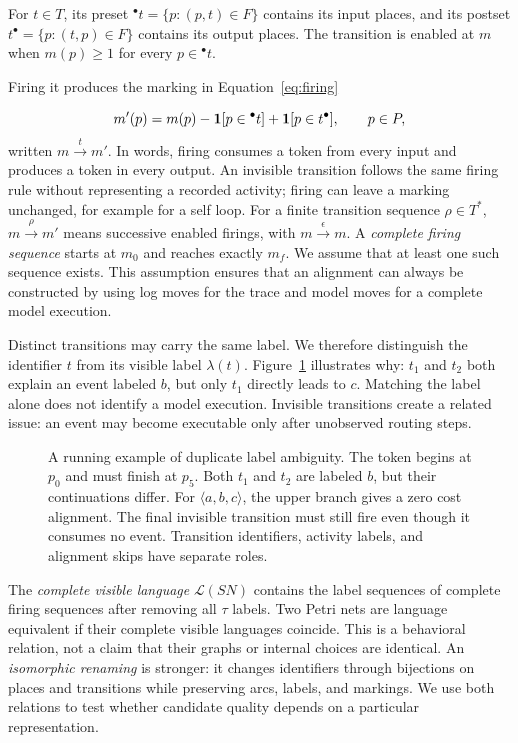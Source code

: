 For $t\in T$, its preset ${}^\bullet t=\{p:(p,t)\in F\}$ contains its input places, and its postset $t^\bullet=\{p:(t,p)\in F\}$ contains its output places. The transition is enabled at $m$ when $m(p)\geq1$ for every $p\in{}^\bullet t$. \begin{revised}Firing it produces the marking in Equation~\eqref{eq:firing}\end{revised}
\begin{equation}
 m'(p)=m(p)-\mathbf{1}[p\in{}^\bullet t]+\mathbf{1}[p\in t^\bullet],
 \qquad p\in P,
 \label{eq:firing}
\end{equation}
written $m\xrightarrow{t}m'$. In words, firing consumes a token from every input and produces a token in every output. An invisible transition follows the same firing rule without representing a recorded activity; firing can leave a marking unchanged, for example for a self loop. For a finite transition sequence $\rho\in T^*$, $m\xrightarrow{\rho}m'$ means successive enabled firings, with $m\xrightarrow{\epsilon}m$. A \emph{complete firing sequence} starts at $m_0$ and reaches exactly $m_f$. We assume that at least one such sequence exists. This assumption ensures that an alignment can always be constructed by using log moves for the trace and model moves for a complete model execution.

Distinct transitions may carry the same label. We therefore distinguish the identifier $t$ from its visible label $\lambda(t)$. Figure~\ref{fig:running} illustrates why: $t_1$ and $t_2$ both explain an event labeled $b$, but only $t_1$ directly leads to $c$. Matching the label alone does not identify a model execution. Invisible transitions create a related issue: an event may become executable only after unobserved routing steps.

\begin{figure}[!t]
\centering

\caption{A running example of duplicate label ambiguity. The token begins at $p_0$ and must finish at $p_5$. Both $t_1$ and $t_2$ are labeled $b$, but their continuations differ. For $\langle a,b,c\rangle$, the upper branch gives a zero cost alignment. The final invisible transition must still fire even though it consumes no event. Transition identifiers, activity labels, and alignment skips have separate roles.}
\label{fig:running}
\end{figure}

The \emph{complete visible language} $\mathcal L(SN)$ contains the label sequences of complete firing sequences after removing all $\tau$ labels. Two Petri nets are language equivalent if their complete visible languages coincide. This is a behavioral relation, not a claim that their graphs or internal choices are identical. An \emph{isomorphic renaming} is stronger: it changes identifiers through bijections on places and transitions while preserving arcs, labels, and markings. We use both relations to test whether candidate quality depends on a particular representation.

